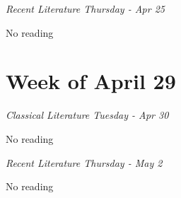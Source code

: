 \documentclass[12pt, notitlepage]{article}   	%
\begin{document}
{\textit{Recent Literature Thursday - Apr 25} \par
No reading \par

\section*{Week of April 29}
\textit{Classical Literature Tuesday - Apr 30} \par
No reading \par

\textit{Recent Literature Thursday - May 2} \par
No reading \par

} %
\end{document}
